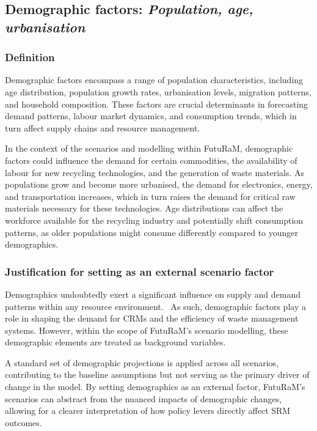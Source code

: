 \subsection{Demographic factors: \textit{Population, age, urbanisation}}\label{sec:quantification_demographic}

\subsubsection{Definition}

Demographic factors encompass a range of population characteristics, including
age distribution, population growth rates, urbanisation levels, migration
patterns, and household composition. These factors are crucial determinants in
forecasting demand patterns, labour market dynamics, and consumption trends,
which in turn affect supply chains and resource management.

In the context of the scenarios and modelling within FutuRaM, demographic
factors could influence the demand for certain commodities, the availability of
labour for new recycling technologies, and the generation of waste materials.
As populations grow and become more urbanised, the demand for electronics,
energy, and transportation increases, which in turn raises the demand for
critical raw materials necessary for these technologies. Age distributions can
affect the workforce available for the recycling industry and potentially shift
consumption patterns, as older populations might consume differently compared
to younger demographics.




\subsubsection{Justification for setting as an external scenario factor}

Demographics undoubtedly exert a significant influence on supply and demand
patterns within any resource environment.~\cite{irp2019globalresourcesoutlook} As such, demographic factors play a
role in shaping the demand for CRMs and the efficiency of waste management
systems. However, within the scope of FutuRaM's scenario modelling, these
demographic elements are treated as background variables.

A standard set of demographic projections is applied across all scenarios,
contributing to the baseline assumptions but not serving as the primary driver
of change in the model. By setting demographics as an external factor,
FutuRaM's scenarios can abstract from the nuanced impacts of demographic
changes, allowing for a clearer interpretation of how policy levers directly
affect SRM outcomes.

